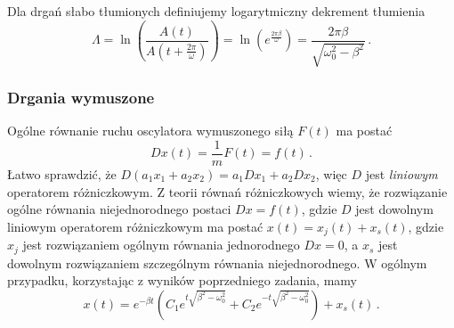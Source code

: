 \documentclass[../main.tex]{subfiles}
\begin{document}
    Dla drgań słabo tłumionych definiujemy logarytmiczny dekrement tłumienia
    \begin{equation*}
        \Lambda=\ln\left(\frac{A(t)}{A\left(t+\frac{2\pi}{\omega}\right)}\right)=\ln\left(e^{\frac{2\pi\beta}{\omega}}\right)=\frac{2\pi\beta}{\sqrt{\omega_0^2-\beta^2}}\,.
    \end{equation*}
    \subsubsection{Drgania wymuszone}
    Ogólne równanie ruchu oscylatora wymuszonego siłą \(F(t)\) ma postać
    \begin{equation*}
        Dx(t)=\frac{1}{m}F(t)=f(t)\,.
    \end{equation*}
    Łatwo sprawdzić, że \(D(a_1x_1+a_2x_2)=a_1Dx_1+a_2Dx_2\), więc \(D\) jest \textit{liniowym}
    operatorem różniczkowym. Z teorii równań różniczkowych wiemy, że rozwiązanie ogólne równania
    niejednorodnego postaci \(Dx=f(t)\), gdzie \(D\) jest dowolnym liniowym operatorem różniczkowym
    ma postać \(x(t)=x_j(t)+x_s(t)\), gdzie \(x_j\) jest rozwiązaniem ogólnym równania jednorodnego
    \(Dx=0\), a \(x_s\) jest dowolnym rozwiązaniem szczególnym równania niejednorodnego. W ogólnym
    przypadku, korzystając z wyników poprzedniego zadania, mamy 
    \begin{equation*}
        x(t)=e^{-\beta t}\left(C_1e^{t\sqrt{\beta^2-\omega_0^2}}+C_2e^{-t\sqrt{\beta^2-\omega_0^2}}\right)+x_s(t)\,.
    \end{equation*}
\end{document}
